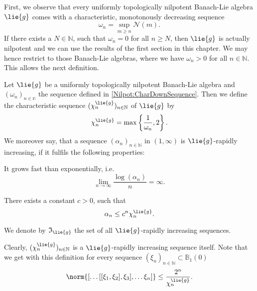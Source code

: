 First, we observe that every uniformly topologically nilpotent Banach-Lie 
algebra $\lie{g}$ comes with a characteristic, monotonously decreasing sequence
\begin{equation}
	\label{Nilpot:CharDownSequence}
	\omega_n
	=
	\sup_{m \geq n} \mathcal{N}(m).	
\end{equation}
If there exists a $N \in \mathbb{N}$, such that $\omega_n = 0$ for all $n \geq 
N$, then $\lie{g}$ is actually nilpotent and we can use the results of the 
first section in this chapter. We may hence restrict to those Banach-Lie 
algebras, where we have $\omega_n > 0$ for all $n \in \mathbb{N}$. This allows 
the next definition.
\begin{definition}
	Let $\lie{g}$ be a uniformly topologically nilpotent Banach-Lie algebra and 
	$(\omega_n)_{n \in \mathbb{n}}$ the sequence defined in 
	\eqref{Nilpot:CharDownSequence}. Then we 
	define the characteristic sequence $(\chi_n^{\lie{g}})_{n \in \mathbb{N}}$ 
	of $\lie{g}$ by
	\begin{equation}
		\label{Nilpot:CharSequence}
		\chi_n^{\lie{g}}
		=
		\max
		\left\{ 
			\frac{1}{\omega_n}
			,
			2
		\right\}.
	\end{equation}
	We moreover say, that a sequence $(\alpha_n)_{n \in \mathbb{N}}$ in 
	$(1, \infty)$ is $\lie{g}$-rapidly increasing, if it fulfils the following 
	properties:
	\begin{definitionlist}
		\item
		It grows fast than exponentially, i.e.
		\begin{equation*}
			\lim_{n \longrightarrow \infty}
			\frac{\log \left(\alpha_n \right)}{n}
			=
			\infty.
		\end{equation*}
		
		\item
		There exists a constant $c > 0$, such that
		\begin{equation*}
			\alpha_n 
			\leq 
			c^n  \chi_n^{\lie{g}}.
		\end{equation*}
	\end{definitionlist}
	We denote by $\mathfrak{I}_{\lie{g}}$ the set of all $\lie{g}$-rapidly 
	increasing sequences.
\end{definition}
Clearly, $(\chi_n^{\lie{g}})_{n \in \mathbb{N}}$ is a $\lie{g}$-rapidly 
increasing sequence itself. Note that we get with this definition for every 
sequence $(\xi_n)_{n \in \mathbb{N}} \subset \mathbb{B}_1(0)$
\begin{equation}
	\label{Nilpot:ChiEstimate}
	\norm{
		[ \ldots [[\xi_1, \xi_2], \xi_3], \ldots \xi_n]
	}
	\leq
	\frac{2^n}{\chi^{\lie{g}}_n}.
\end{equation}
